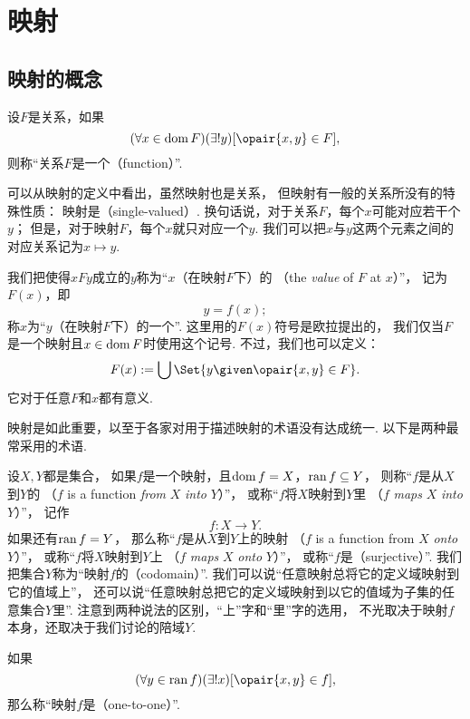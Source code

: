 \section{映射}
\subsection{映射的概念}
\begin{definition}
设\(F\)是关系，如果\[
	(\forall x \in \dom F)(\exists! y)[\opair{x,y} \in F],
\]
则称“关系\(F\)是一个（function）”.
\end{definition}
可以从映射的定义中看出，虽然映射也是关系，
但映射有一般的关系所没有的特殊性质：
映射是（single-valued）.
换句话说，对于关系\(F\)，每个\(x\)可能对应若干个\(y\)；
但是，对于映射\(F\)，每个\(x\)就只对应一个\(y\).
我们可以把\(x\)与\(y\)这两个元素之间的对应关系记为\(x \mapsto y\).

我们把使得\(xFy\)成立的\(y\)称为“\(x\)（在映射\(F\)下）的%
（the \emph{value} of \(F\) at \(x\)）”，
记为\(F(x)\)，即\[
	y = f(x);
\]
称\(x\)为“\(y\)（在映射\(F\)下）的一个”.
这里用的\(F(x)\)符号是欧拉提出的，
我们仅当\(F\)是一个映射且\(x\in\operatorname{dom} F\)时使用这个记号.
不过，我们也可以定义：\[
	F(x) \defeq \bigcup\Set{ y \given \opair{x,y} \in F }.
\]
它对于任意\(F\)和\(x\)都有意义.

映射是如此重要，以至于各家对用于描述映射的术语没有达成统一.
以下是两种最常采用的术语.

设\(X,Y\)都是集合，
如果\(f\)是一个映射，且\(\operatorname{dom} f = X\)，\(\operatorname{ran} f \subseteq Y\)，
则称“\(f\)是从\(X\)到\(Y\)的%
（\(f\) is a function \emph{from} \(X\) \emph{into} \(Y\)）”，
或称“\(f\)将\(X\)映射到\(Y\)里%
（\(f\) \emph{maps} \(X\) \emph{into} \(Y\)）”，
记作\[
	f\colon X \to Y.
\]
如果还有\(\operatorname{ran} f = Y\)，
那么称“\(f\)是从\(X\)到\(Y\)上的映射%
（\(f\) is a function from \(X\) \emph{onto} \(Y\)）”，
或称“\(f\)将\(X\)映射到\(Y\)上%
（\(f\) \emph{maps} \(X\) \emph{onto} \(Y\)）”，
或称“\(f\)是（surjective）”.
我们把集合\(Y\)称为“映射\(f\)的（codomain）”.
我们可以说“任意映射总将它的定义域映射到它的值域上”，
还可以说“任意映射总把它的定义域映射到以它的值域为子集的任意集合\(Y\)里”.
注意到两种说法的区别，“上”字和“里”字的选用，
不光取决于映射\(f\)本身，还取决于我们讨论的陪域\(Y\).

如果\[
	(\forall y \in \ran f)
	(\exists! x)
	[\opair{x,y} \in f],
\]
那么称“映射\(f\)是（one-to-one）”.

